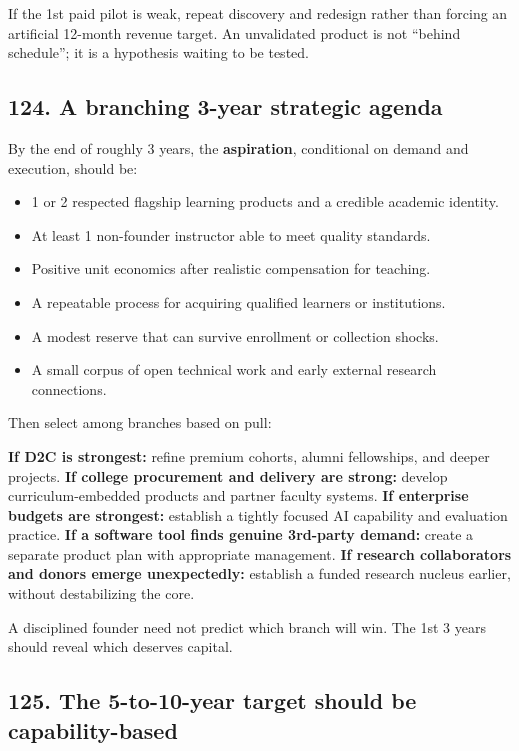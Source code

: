If the 1st paid pilot is weak, repeat discovery and redesign rather than forcing an artificial 12-month revenue target. An unvalidated product is not ``behind schedule''; it is a hypothesis waiting to be tested.

\subsection{124. A branching 3-year strategic agenda}

By the end of roughly 3 years, the \textbf{aspiration}, conditional on demand and execution, should be:

\begin{itemize}[leftmargin=*,itemsep=1.5pt]
  \item 1 or 2 respected flagship learning products and a credible academic identity.
  \item At least 1 non-founder instructor able to meet quality standards.
  \item Positive unit economics after realistic compensation for teaching.
  \item A repeatable process for acquiring qualified learners or institutions.
  \item A modest reserve that can survive enrollment or collection shocks.
  \item A small corpus of open technical work and early external research connections.
\end{itemize}

Then select among branches based on pull:

\textbf{If D2C is strongest:} refine premium cohorts, alumni fellowships, and deeper projects.
\textbf{If college procurement and delivery are strong:} develop curriculum-embedded products and partner faculty systems.
\textbf{If enterprise budgets are strongest:} establish a tightly focused AI capability and evaluation practice.
\textbf{If a software tool finds genuine 3rd-party demand:} create a separate product plan with appropriate management.
\textbf{If research collaborators and donors emerge unexpectedly:} establish a funded research nucleus earlier, without destabilizing the core.

A disciplined founder need not predict which branch will win. The 1st 3 years should reveal which deserves capital.

\subsection{125. The 5-to-10-year target should be capability-based}

